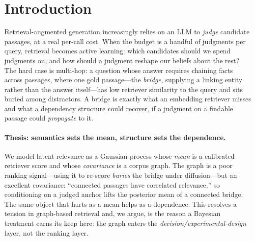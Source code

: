 \documentclass[11pt]{article}
\theoremstyle{plain}\newtheorem{theorem}{Theorem}\newtheorem{lemma}{Lemma}\newtheorem{proposition}{Proposition}
\theoremstyle{definition}\newtheorem{assumption}{Assumption}\newtheorem{remark}{Remark}
\begin{document}
\section{Introduction}
Retrieval-augmented generation increasingly relies on an LLM to \emph{judge} candidate passages, at a real
per-call cost. When the budget is a handful of judgments per query, retrieval becomes active learning: which
candidates should we spend judgments on, and how should a judgment reshape our beliefs about the rest? The hard
case is multi-hop: a question whose answer requires chaining facts across passages, where one gold passage---the
\emph{bridge}, supplying a linking entity rather than the answer itself---has low retriever similarity to the
query and sits buried among distractors. A bridge is exactly what an embedding retriever misses and what a
dependency structure could recover, if a judgment on a findable passage could \emph{propagate} to it.

\paragraph{Thesis: semantics sets the mean, structure sets the dependence.} We model latent relevance as a
Gaussian process whose \emph{mean} is a calibrated retriever score and whose \emph{covariance} is a corpus graph.
The graph is a poor ranking signal---using it to re-score \emph{buries} the bridge under diffusion---but an
excellent covariance: ``connected passages have correlated relevance,'' so conditioning on a judged anchor lifts
the posterior mean of a connected bridge. The same object that hurts as a mean helps as a dependence. This
resolves a tension in graph-based retrieval and, we argue, is the reason a Bayesian treatment earns its keep here:
the graph enters the \emph{decision/experimental-design} layer, not the ranking layer.
\end{document}
